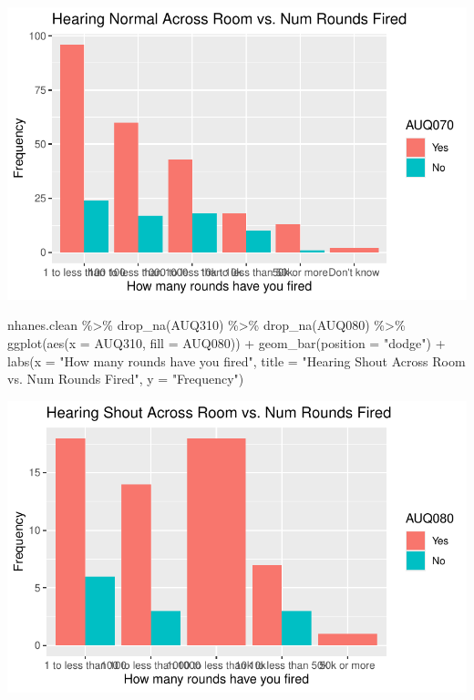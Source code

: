 \documentclass[
  letterpaper,
  DIV=11,
  numbers=noendperiod]{scrreprt}
\newenvironment{Shaded}{\begin{snugshade}}{\end{snugshade}}
\newcommand{\AttributeTok}[1]{\textcolor[rgb]{0.40,0.45,0.13}{#1}}
\newcommand{\FunctionTok}[1]{\textcolor[rgb]{0.28,0.35,0.67}{#1}}
\newcommand{\NormalTok}[1]{\textcolor[rgb]{0.00,0.23,0.31}{#1}}
\newcommand{\SpecialCharTok}[1]{\textcolor[rgb]{0.37,0.37,0.37}{#1}}
\newcommand{\StringTok}[1]{\textcolor[rgb]{0.13,0.47,0.30}{#1}}
\begin{document}
\includegraphics{dataviz_files/figure-pdf/unnamed-chunk-59-2.pdf}

\begin{Shaded}
\begin{Highlighting}[]
\NormalTok{nhanes.clean }\SpecialCharTok{\%\textgreater{}\%}
    \FunctionTok{drop\_na}\NormalTok{(AUQ310) }\SpecialCharTok{\%\textgreater{}\%}
    \FunctionTok{drop\_na}\NormalTok{(AUQ080) }\SpecialCharTok{\%\textgreater{}\%}
    \FunctionTok{ggplot}\NormalTok{(}\FunctionTok{aes}\NormalTok{(}\AttributeTok{x =}\NormalTok{ AUQ310, }\AttributeTok{fill =}\NormalTok{ AUQ080)) }\SpecialCharTok{+} \FunctionTok{geom\_bar}\NormalTok{(}\AttributeTok{position =} \StringTok{"dodge"}\NormalTok{) }\SpecialCharTok{+}
    \FunctionTok{labs}\NormalTok{(}\AttributeTok{x =} \StringTok{"How many rounds have you fired"}\NormalTok{, }\AttributeTok{title =} \StringTok{"Hearing Shout Across Room vs. Num Rounds Fired"}\NormalTok{,}
        \AttributeTok{y =} \StringTok{"Frequency"}\NormalTok{)}
\end{Highlighting}
\end{Shaded}

\includegraphics{dataviz_files/figure-pdf/unnamed-chunk-59-3.pdf}
\end{document}
